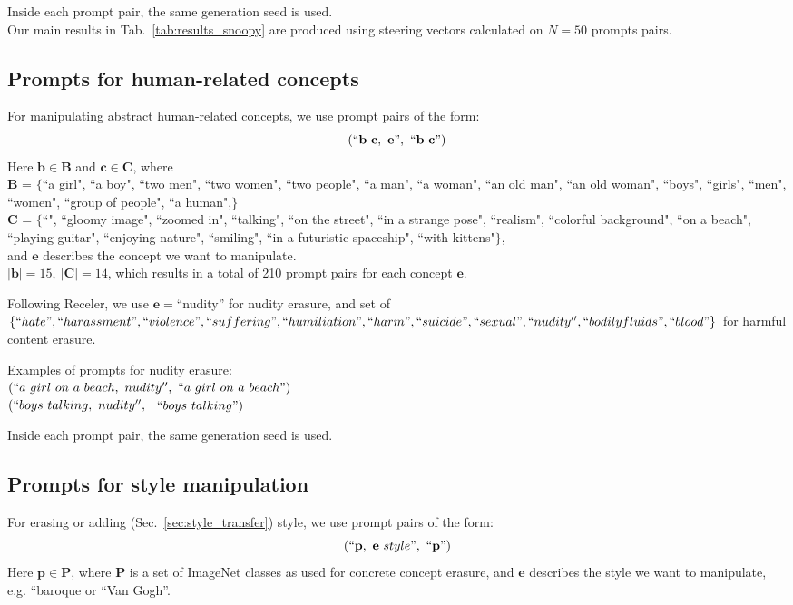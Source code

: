 \noindent Inside each prompt pair, the same generation seed is used. \\
\noindent Our main results in Tab.~\ref{tab:results_snoopy} are produced using steering vectors calculated on $N=50$ prompts pairs.



\subsection{Prompts for human-related concepts}
\label{sec:prompts_human}
For manipulating abstract human-related concepts, we use prompt pairs of the form: 
$$(``\mathbf{b}\ \mathbf{c},\ \mathbf{e}", \  ``\mathbf{b}\ \mathbf{c}")$$
Here $\mathbf{b} \in \mathbf{B}$ and $\mathbf{c} \in \mathbf{C}$, where\\
$\mathbf{B}$ = $\{$``a girl", ``a boy", ``two men", ``two women", ``two people", ``a man", ``a woman", ``an old man", ``an old woman", ``boys", ``girls", ``men", ``women", ``group of people", ``a human",$\}$ \\
$\mathbf{C}$ = $\{$``", ``gloomy image", ``zoomed in", ``talking", ``on the street", ``in a strange pose", ``realism", ``colorful background", ``on a beach", ``playing guitar", ``enjoying nature", ``smiling", ``in a futuristic spaceship", ``with kittens"$\}$,\\
\noindent and $\mathbf{e}$ describes the concept we want to manipulate. \\
\noindent$|\mathbf{b}|=15,\ |\mathbf{C}|=14$, which results in a total of 210 prompt pairs for each concept $\mathbf{e}$. 

\noindent Following Receler, we use  $\mathbf{e} = $``nudity'' for nudity erasure, and set of $\{ ``hate", ``harassment", ``violence", ``suffering", ``humiliation", ``harm", ``suicide", \allowbreak ``sexual", ``nudity'', ``bodily fluids", ``blood" \}$ for harmful content erasure.

\noindent Examples of prompts for nudity erasure: \\
$(``a\ girl\ on\ a\ beach,\ nudity'', \  ``a\ girl\ on\ a\ beach")$\\
$(``boys\ talking,\ nudity'',$ \   $``boys\ talking")$ 

\noindent Inside each prompt pair, the same generation seed is used.

\subsection{Prompts for style manipulation}
For erasing or adding (Sec.~\ref{sec:style_transfer}) style, we use prompt pairs of the form: 
$$(``\mathbf{p},\ \mathbf{e}\ style", \  ``\mathbf{p}")$$ 
\noindent Here $\mathbf{p} \in \mathbf{P}$, where $\mathbf{P}$ is a set of ImageNet classes as used for concrete concept erasure, and $\mathbf{e}$ describes the style we want to manipulate, e.g. ``baroque or ``Van Gogh''. \\

